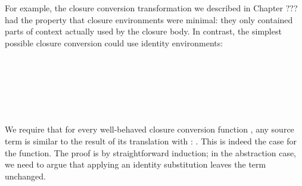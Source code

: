 For example, the closure conversion transformation we described in
Chapter ??? had the property that closure environments were minimal:
they only contained parts of context actually used by the closure
body. In contrast, the simplest possible closure conversion could use
identity environments:

\begin{code}%
\>[0]\AgdaSpace{}%
\AgdaSymbol{:}\AgdaSpace{}%
\AgdaSpace{}%
\AgdaSymbol{\{}\AgdaSpace{}%
\AgdaSymbol{\}}\<%
\\
\>[0][@{}l@{\AgdaIndent{0}}]%
\>[2]\AgdaSpace{}%
\AgdaSpace{}%
\AgdaSpace{}%
\<%
\\
%
\>[2]\AgdaSpace{}%
\AgdaSpace{}%
\AgdaSpace{}%
\<%
\\
\>[0]\AgdaSpace{}%
\AgdaSymbol{(}\AgdaSpace{}%
\AgdaSymbol{)}\AgdaSpace{}%
\AgdaSymbol{=}\AgdaSpace{}%
\AgdaSpace{}%
\<%
\\
\>[0]\AgdaSpace{}%
\AgdaSymbol{(}\AgdaSpace{}%
\AgdaSpace{}%
\AgdaSymbol{)}\AgdaSpace{}%
\AgdaSymbol{=}\AgdaSpace{}%
\AgdaSpace{}%
\AgdaSymbol{(}\AgdaSpace{}%
\AgdaSymbol{)}\AgdaSpace{}%
\AgdaSymbol{(}\AgdaSpace{}%
\AgdaSymbol{)}\<%
\\
\>[0]\AgdaSpace{}%
\AgdaSymbol{(}\AgdaSpace{}%
\AgdaSymbol{)}\AgdaSpace{}%
\AgdaSymbol{=}\AgdaSpace{}%
\AgdaSpace{}%
\AgdaSymbol{(}\AgdaSpace{}%
\AgdaSymbol{)}\AgdaSpace{}%
\<%
\end{code}

We require that for every well-behaved closure conversion function , any
source term  is similar to the result of its translation with
: . This is indeed the case for the 
function. The proof is by straightforward induction; in the
abstraction case, we need to argue that applying an identity substitution
leaves the term unchanged.

